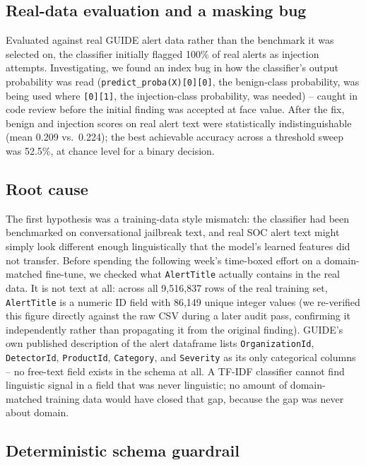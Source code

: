 \documentclass[conference]{IEEEtran}
\begin{document}
\subsection{Real-data evaluation and a masking bug}

Evaluated against real GUIDE alert data rather than the benchmark it was selected on, the
classifier initially flagged 100\% of real alerts as injection attempts. Investigating, we found
an index bug in how the classifier's output probability was read (\texttt{predict\_proba(X)[0][0]},
the benign-class probability, was being used where \texttt{[0][1]}, the injection-class
probability, was needed) -- caught in code review before the initial finding was accepted at face
value. After the fix, benign and injection scores on real alert text were statistically
indistinguishable (mean 0.209 vs.\ 0.224); the best achievable accuracy across a threshold sweep
was 52.5\%, at chance level for a binary decision.

\subsection{Root cause}
\label{sec:rootcause}

The first hypothesis was a training-data style mismatch: the classifier had been benchmarked on
conversational jailbreak text, and real SOC alert text might simply look different enough
linguistically that the model's learned features did not transfer. Before spending the following
week's time-boxed effort on a domain-matched fine-tune, we checked what \texttt{AlertTitle}
actually contains in the real data. It is not text at all: across all 9{,}516{,}837 rows of the
real training set, \texttt{AlertTitle} is a numeric ID field with 86{,}149 unique integer values
(we re-verified this figure directly against the raw CSV during a later audit pass, confirming it
independently rather than propagating it from the original finding). GUIDE's own published
description of the alert dataframe lists \texttt{OrganizationId}, \texttt{DetectorId},
\texttt{ProductId}, \texttt{Category}, and \texttt{Severity} as its only categorical columns --
no free-text field exists in the schema at all. A TF-IDF classifier cannot find linguistic signal
in a field that was never linguistic; no amount of domain-matched training data would have closed
that gap, because the gap was never about domain.

\subsection{Deterministic schema guardrail}
\end{document}
